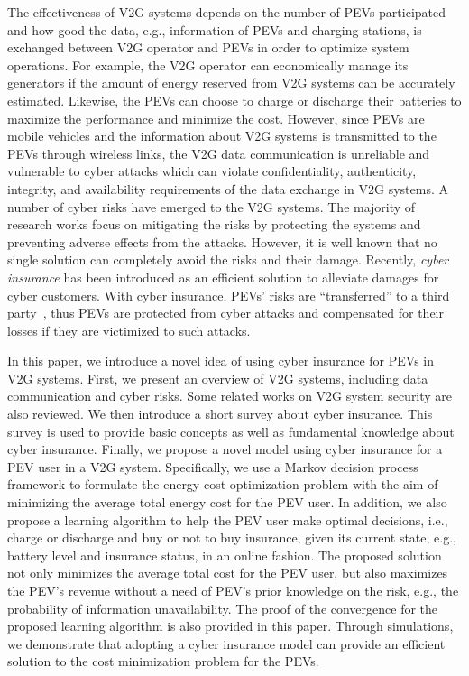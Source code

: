 \documentclass[twocolumn,10pt]{IEEEtran}
\begin{document}
The effectiveness of V2G systems depends on the number of PEVs participated and how good the data, e.g., information of PEVs and charging stations, is exchanged between V2G operator and PEVs in order to optimize system operations. For example, the V2G operator can economically manage its generators if the amount of energy reserved from V2G systems can be accurately estimated. Likewise, the PEVs can choose to charge or discharge their batteries to maximize the performance and minimize the cost. However, since PEVs are mobile vehicles and the information about V2G systems is transmitted to the PEVs through wireless links, the V2G data communication is unreliable and vulnerable to cyber attacks which can violate confidentiality, authenticity, integrity, and availability requirements of the data exchange in V2G systems. A number of cyber risks have emerged to the V2G systems. The majority of research works focus on mitigating the risks by protecting the systems and preventing adverse effects from the attacks. However, it is well known that no single solution can completely avoid the risks and their damage. Recently, \emph{cyber insurance} has been introduced as an efficient solution to alleviate damages for cyber customers. With cyber insurance, PEVs' risks are ``transferred'' to a third party~\cite{Gordon2003AFrame}, thus PEVs are protected from cyber attacks and compensated for their losses if they are victimized to such attacks.

In this paper, we introduce a novel idea of using cyber insurance for PEVs in V2G systems. First, we present an overview of V2G systems, including data communication and cyber risks. Some related works on V2G system security are also reviewed. We then introduce a short survey about cyber insurance. This survey is used to provide basic concepts as well as fundamental knowledge about cyber insurance. Finally, we propose a novel model using cyber insurance for a PEV user in a V2G system. Specifically, we use a Markov decision process framework to formulate the energy cost optimization problem with the aim of minimizing the average total energy cost for the PEV user. In addition, we also propose a learning algorithm to help the PEV user make optimal decisions, i.e., charge or discharge and buy or not to buy insurance, given its current state, e.g., battery level and insurance status, in an online fashion. The proposed solution not only minimizes the average total cost for the PEV user, but also maximizes the PEV's revenue without a need of PEV's prior knowledge on the risk, e.g., the probability of information unavailability. The proof of the convergence for the proposed learning algorithm is also provided in this paper. Through simulations, we demonstrate that adopting a cyber insurance model can provide an efficient  solution to the cost minimization problem for the PEVs. 
\end{document}
